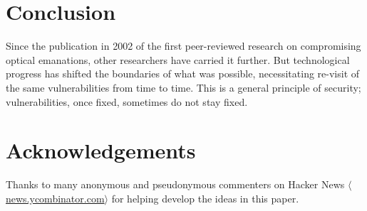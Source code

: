 \documentclass[conference]{IEEEtran}
\newcommand{\URL}[1]{$\langle$\url{#1}$\rangle$}
\begin{document}
\section{Conclusion}

Since the publication in 2002 of the first peer-reviewed research on
compromising optical emanations, other researchers have carried it further.
But technological progress has shifted the boundaries of what was possible,
necessitating re-visit of the same vulnerabilities from time to time. This is
a general principle of security; vulnerabilities, once fixed, sometimes do
not stay fixed.

\section*{Acknowledgements}

Thanks to many anonymous and pseudonymous commenters on Hacker News
\URL{news.ycombinator.com} for helping develop the ideas in this paper.






\end{document}
